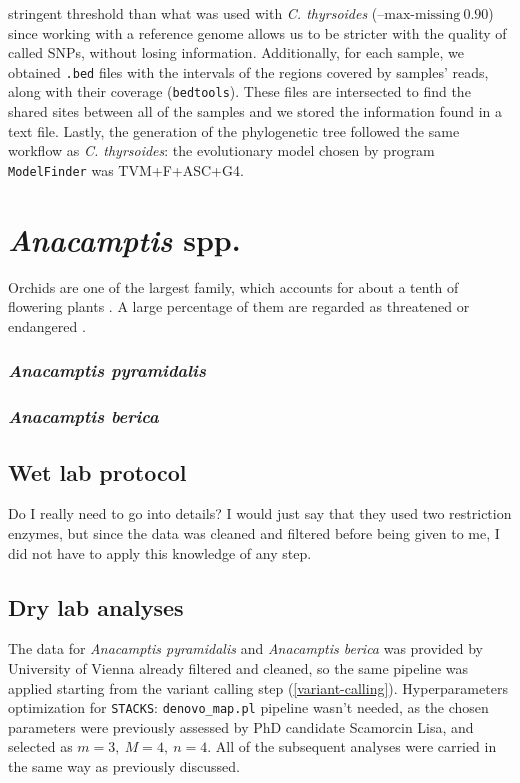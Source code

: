 \documentclass[a4paper, 12pt]{report}
\begin{document}
stringent threshold than what was used with \textit{C. thyrsoides} ($\text{--max-missing} \ 0.90$) since working with a reference genome allows us to be stricter with the quality of called SNPs, without losing information. Additionally, for each sample, we obtained \texttt{.bed} files with the intervals of the regions covered by samples' reads, along with their coverage (\texttt{bedtools}). These files are intersected to find the shared sites between all of the samples and we stored the information found in a text file. Lastly, the generation of the phylogenetic tree followed the same workflow as \textit{C. thyrsoides}: the evolutionary model chosen by program \texttt{ModelFinder} was TVM+F+ASC+G4.

\newpage
\section{\textit{Anacamptis} spp.}
Orchids are one of the largest family, which accounts for about a tenth of flowering plants \parencite{yinPlantConservationAge2024}. A large percentage of them are regarded as threatened or endangered \parencite{yinPlantConservationAge2024}.

\subsubsection{\textit{Anacamptis pyramidalis}}
\subsubsection{\textit{Anacamptis berica}}

\subsection{Wet lab protocol}
Do I really need to go into details? I would just say that they used two restriction enzymes, but since the data was cleaned and filtered before being given to me, I did not have to apply this knowledge of any step.

\subsection{Dry lab analyses}
The data for \textit{Anacamptis pyramidalis} and \textit{Anacamptis berica} was provided by University of Vienna already filtered and cleaned, so the same pipeline was applied starting from the variant calling step (\autoref{variant-calling}). Hyperparameters optimization for \texttt{STACKS}: \texttt{denovo\_map.pl} pipeline wasn't needed, as the chosen parameters were previously assessed by PhD candidate Scamorcin Lisa, and selected as $m = 3, \ M = 4, \ n = 4$. All of the subsequent analyses were carried in the same way as previously discussed.
\end{document}
